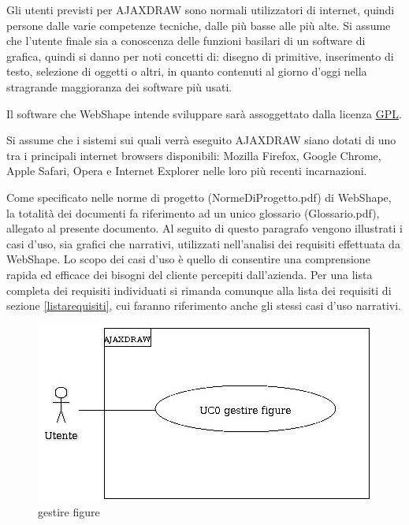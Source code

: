 \label{definizione_utente}
Gli utenti previsti per AJAXDRAW sono normali utilizzatori di internet, quindi persone dalle varie competenze tecniche, dalle pi\`u basse alle pi\`u alte. Si assume che l'utente finale sia a conoscenza delle funzioni basilari di un software di grafica, quindi si danno per noti concetti di: disegno di primitive, inserimento di testo, selezione di oggetti o altri, in quanto contenuti al giorno d'oggi nella stragrande maggioranza dei software pi\`u usati.

Il software che WebShape intende sviluppare sar\`a assoggettato dalla licenza \underline{GPL}.

Si assume che i sistemi sui quali verr\`a eseguito AJAXDRAW siano dotati di uno tra i principali internet browsers disponibili: Mozilla Firefox, Google Chrome, Apple Safari, Opera e Internet Explorer nelle loro pi\`u recenti incarnazioni.

Come specificato nelle norme di progetto (NormeDiProgetto.pdf) di WebShape, la totalit\` a dei documenti fa riferimento ad un unico glossario (Glossario.pdf), allegato al presente documento.
\newpage
{}
Al seguito di questo paragrafo vengono illustrati i casi d'uso, sia grafici che narrativi, utilizzati nell'analisi dei requisiti effettuata da WebShape. Lo scopo dei casi d'uso \`e quello di consentire una comprensione rapida ed efficace dei bisogni del cliente percepiti dall'azienda. Per una lista completa dei requisiti individuati si rimanda comunque alla lista dei requisiti di sezione \ref{listarequisiti}, cui faranno riferimento anche gli stessi casi d'uso narrativi.

\begin{figure}[!ht]
\centering
\includegraphics{AJAXDRAW.jpg}
\caption{gestire figure}
\end{figure}

